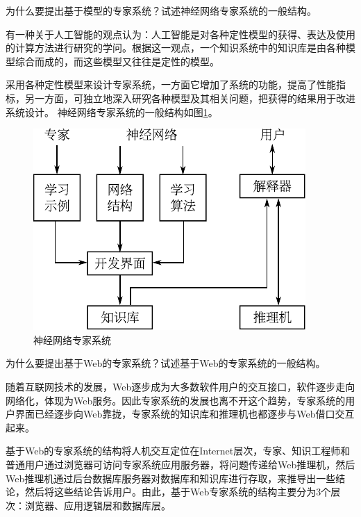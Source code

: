 \begin{question}
为什么要提出基于模型的专家系统？试述神经网络专家系统的一般结构。
\end{question}
\begin{solution}
有一种关于人工智能的观点认为：人工智能是对各种定性模型的获得、表达及使用的计算方法进行研究的学问。根据这一观点，一个知识系统中的知识库是由各种模型综合而成的，而这些模型又往往是定性的模型。 \par
采用各种定性模型来设计专家系统，一方面它增加了系统的功能，提高了性能指标，另一方面，可独立地深入研究各种模型及其相关问题，把获得的结果用于改进系统设计。
神经网络专家系统的一般结构如图\ref{Fig:NNES-structure}。
	\begin{figure}[h]
		\centering
		\includegraphics{figures/ans-6.7.pdf}
		\caption{神经网络专家系统} \label{Fig:NNES-structure}
	\end{figure}
\end{solution}

\begin{question}
为什么要提出基于Web的专家系统？试述基于Web的专家系统的一般结构。
\end{question}
\begin{solution}
随着互联网技术的发展，Web逐步成为大多数软件用户的交互接口，软件逐步走向网络化，体现为Web服务。因此专家系统的发展也离不开这个趋势，专家系统的用户界面已经逐步向Web靠拢，专家系统的知识库和推理机也都逐步与Web借口交互起来。\par 
基于Web的专家系统的结构将人机交互定位在Internet层次，专家、知识工程师和普通用户通过浏览器可访问专家系统应用服务器，将问题传递给Web推理机，然后Web推理机通过后台数据库服务器对数据库和知识库进行存取，来推导出一些结论，然后将这些结论告诉用户。由此，基于Web专家系统的结构主要分为3个层次：浏览器、应用逻辑层和数据库层。
\end{solution}

